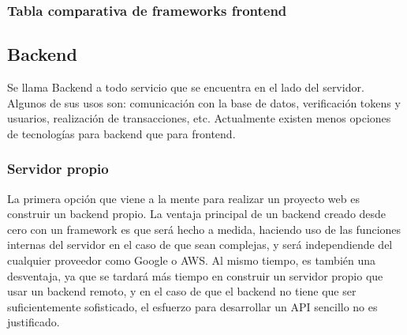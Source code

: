 \subsubsection{Tabla comparativa de frameworks frontend}
\begin{table}[H]
	\centering
	\caption{Comparativa de frameworks multiplataforma}
	\label{tabla-frontend-final}
\end{table}
\newpage
\subsection{Backend}
Se llama Backend a todo servicio que se encuentra en el lado del servidor. Algunos de sus usos son: comunicación con la base de datos, verificación tokens y usuarios, realización de transacciones, etc. Actualmente existen menos opciones de tecnologías para backend que para frontend. \citep{frontend}
\subsubsection{Servidor propio}
La primera opción que viene a la mente para realizar un proyecto web es construir un backend propio. La ventaja principal de un backend creado desde cero con un framework es que será hecho a medida, haciendo uso de las funciones internas del servidor en el caso de que sean complejas, y será independiende del cualquier proveedor como Google o AWS. Al mismo tiempo, es también una desventaja, ya que se tardará más tiempo en construir un servidor propio que usar un backend remoto, y en el caso de que el backend no tiene que ser suficientemente sofisticado, el esfuerzo para desarrollar un API sencillo no es justificado.
